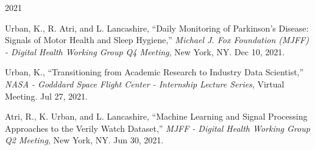 \begin{center} \Large{2021} \end{center}
\normalsize
\begin{itemize*}
  \item
    Urban, K., R. Atri, and L. Lancashire, ``Daily Monitoring of Parkinson's
    Disease: Signals of Motor Health and Sleep Hygiene,'' {\em Michael
    J. Fox Foundation (MJFF) -  Digital Health Working Group Q4 Meeting}, 
    New York, NY. Dec 10, 2021. 
  \item
    Urban, K., 
    ``Transitioning from Academic Research to Industry Data Scientist,''
    {\em NASA - Godddard Space Flight Center - Internship Lecture Series}, 
    Virtual Meeting. Jul 27, 2021. 
  \item
    Atri, R., K. Urban, and L. Lancashire, ``Machine Learning and Signal
    Processing Approaches to the Verily Watch Dataset,'' {\em MJFF -
    Digital Health Working Group Q2 Meeting}, New York, NY. Jun 30, 2021. 
\end{itemize*}
